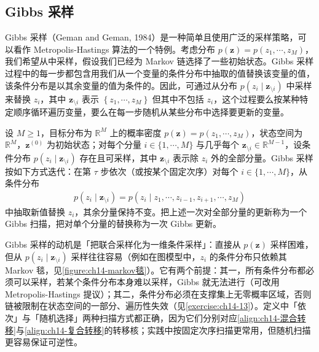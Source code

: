 \documentclass[../../main.tex]{subfiles}
\begin{document}
\subsection{Gibbs 采样}\label{subsection:ch14-gibbs采样}

Gibbs 采样（Geman and Geman, 1984）是一种简单且使用广泛的采样策略，可以看作 Metropolis-Hastings 算法的一个特例。考虑分布 $p(\bm{z})=p\!\left(z_{1},\cdots,z_{M}\right)$，我们希望从中采样，假设我们已经为 Markov 链选择了一些初始状态。Gibbs 采样过程中的每一步都包含用我们从一个变量的条件分布中抽取的值替换该变量的值，该条件分布是以其余变量的值为条件的。因此，可通过从分布 $p\!\left(z_{i}\mid\bm{z}_{\setminus i}\right)$ 中采样来替换 $z_{i}$，其中 $\bm{z}_{\setminus i}$ 表示 $\left\{z_{1},\cdots,z_{M}\right\}$ 但其中不包括 $z_{i}$，这个过程要么按某种特定顺序循环遍历变量，要么在每一步随机从某些分布中选择要更新的变量。

\begin{definition}[Gibbs 采样]\label{definition:ch14-gibbs采样}
设 $M\geqslant1$，目标分布为 $\mathbb{R}^{M}$ 上的概率密度 $p(\bm{z})=p(z_{1},\cdots,z_{M})$，状态空间为 $\mathbb{R}^{M}$，$\bm{z}^{(0)}$ 为初始状态；对每个分量 $i\in\{1,\cdots,M\}$ 与几乎每个 $\bm{z}_{\setminus i}\in\mathbb{R}^{M-1}$，设条件分布 $p(z_{i}\mid\bm{z}_{\setminus i})$ 存在且可采样，其中 $\bm{z}_{\setminus i}$ 表示除 $z_{i}$ 外的全部分量。Gibbs 采样按如下方式迭代：在第 $\tau$ 步依次（或按某个固定次序）对每个 $i\in\{1,\cdots,M\}$，从条件分布
\begin{align*}
p\!\left(z_{i}\mid\bm{z}_{\setminus i}\right)=p\!\left(z_{i}\mid z_{1},\cdots,z_{i-1},z_{i+1},\cdots,z_{M}\right)
\end{align*}
中抽取新值替换 $z_{i}$，其余分量保持不变。把上述一次对全部分量的更新称为一个 Gibbs 扫描，把对单个分量的替换称为一次 Gibbs 更新。
\end{definition}

\begin{remark}Gibbs 采样的动机是「把联合采样化为一维条件采样」：直接从 $p(\bm{z})$ 采样困难，但从 $p\!\left(z_{i}\mid\bm{z}_{\setminus i}\right)$ 采样往往容易（例如在图模型中，$z_{i}$ 的条件分布只依赖其 Markov 毯，见\cref{figure:ch14-markov毯}）。它有两个前提：其一，所有条件分布都必须可以采样，若某个条件分布本身难以采样，Gibbs 就无法进行（可改用 Metropolis-Hastings 提议）；其二，条件分布必须在支撑集上无零概率区域，否则链被限制在状态空间的一部分、遍历性失效（见\cref{exercise:ch14-13}）。定义中「依次」与「随机选择」两种扫描方式都正确，因为它们分别对应\eqref{align:ch14-混合转移}与\eqref{align:ch14-复合转移}的转移核；实践中按固定次序扫描更常用，但随机扫描更容易保证可逆性。
\end{remark}
\end{document}
